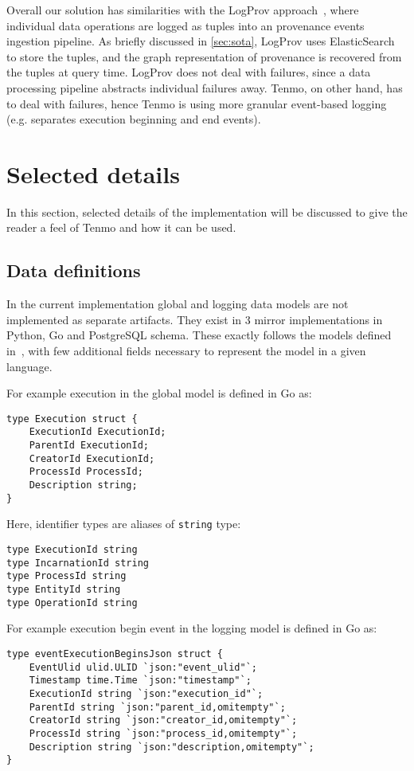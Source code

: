 Overall our solution has similarities with the LogProv approach~\cite{logprov-wang2016}, where individual data operations are logged as tuples into an provenance events ingestion pipeline. As briefly discussed in \cref{sec:sota}, LogProv uses ElasticSearch to store the tuples, and the graph representation of provenance is recovered from the tuples at query time. LogProv does not deal with failures, since a data processing pipeline abstracts individual failures away. Tenmo, on other hand, has to deal with failures, hence Tenmo is using more granular event-based logging (e.g. separates execution beginning and end events).

\section{Selected details}

In this section, selected details of the implementation will be discussed to give the reader a feel of Tenmo and how it can be used.

\subsection{Data definitions}\label{sec:data-definitions}

In the current implementation global and logging data models are not implemented as separate artifacts. They exist in 3 mirror implementations in Python, Go and PostgreSQL schema. These exactly follows the models defined in~, with few additional fields necessary to represent the model in a given language.

For example execution in the global model is defined in Go as:
%
\begin{verbatim}
type Execution struct {
	ExecutionId ExecutionId;
	ParentId ExecutionId;
	CreatorId ExecutionId;
	ProcessId ProcessId;
	Description string;
}
\end{verbatim}

Here, identifier types are aliases of \texttt{string} type:
%
\begin{verbatim}
type ExecutionId string
type IncarnationId string
type ProcessId string
type EntityId string
type OperationId string
\end{verbatim}

For example execution begin event in the logging model is defined in Go as:
%
\begin{verbatim}
type eventExecutionBeginsJson struct {
	EventUlid ulid.ULID `json:"event_ulid"`;
	Timestamp time.Time `json:"timestamp"`;
	ExecutionId string `json:"execution_id"`;
	ParentId string `json:"parent_id,omitempty"`;
	CreatorId string `json:"creator_id,omitempty"`;
	ProcessId string `json:"process_id,omitempty"`;
	Description string `json:"description,omitempty"`;
}
\end{verbatim}

